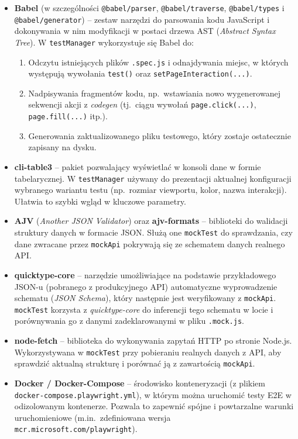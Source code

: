 \documentclass[12pt]{report}
\begin{document}
\begin{itemize}
    \item \textbf{Babel} (w szczególności \verb|@babel/parser|, \verb|@babel/traverse|, \verb|@babel/types| i \verb|@babel/generator|) -- zestaw narzędzi do parsowania kodu JavaScript i dokonywania w nim modyfikacji w postaci drzewa AST (\emph{Abstract Syntax Tree}). W \texttt{testManager} wykorzystuje się Babel do:
    \begin{enumerate}
        \item Odczytu istniejących plików \texttt{.spec.js} i odnajdywania miejsc, w których występują wywołania \texttt{test()} oraz \texttt{setPageInteraction(...)}.
        \item Nadpisywania fragmentów kodu, np.~wstawiania nowo wygenerowanej sekwencji akcji z \emph{codegen} (tj.~ciągu wywołań \verb|page.click(...)|, \verb|page.fill(...)| itp.).
        \item Generowania zaktualizowanego pliku testowego, który zostaje ostatecznie zapisany na dysku.
    \end{enumerate}

    \item \textbf{cli-table3} -- pakiet pozwalający wyświetlać w konsoli dane w formie tabelarycznej. W \texttt{testManager} używany do prezentacji aktualnej konfiguracji wybranego wariantu testu (np.~rozmiar viewportu, kolor, nazwa interakcji). Ułatwia to szybki wgląd w kluczowe parametry.

    \item \textbf{AJV} (\emph{Another JSON Validator}) oraz \textbf{ajv-formats} -- biblioteki do walidacji struktury danych w formacie JSON. Służą one \texttt{mockTest} do sprawdzania, czy dane zwracane przez \texttt{mockApi} pokrywają się ze schematem danych realnego API.

    \item \textbf{quicktype-core} -- narzędzie umożliwiające na podstawie przykładowego JSON-u (pobranego z produkcyjnego API) automatyczne wyprowadzenie schematu (\emph{JSON Schema}), który następnie jest weryfikowany z \texttt{mockApi}. \texttt{mockTest} korzysta z \emph{quicktype-core} do inferencji tego schematu w locie i porównywania go z danymi zadeklarowanymi w pliku \texttt{.mock.js}.

    \item \textbf{node-fetch} -- biblioteka do wykonywania zapytań HTTP po stronie Node.js. Wykorzystywana w \texttt{mockTest} przy pobieraniu realnych danych z API, aby sprawdzić aktualną strukturę i porównać ją z zawartością \texttt{mockApi}.

    \item \textbf{Docker / Docker-Compose} -- środowisko konteneryzacji (z plikiem \texttt{docker-compose.playwright.yml}), w którym można uruchomić testy E2E w odizolowanym kontenerze. Pozwala to zapewnić spójne i powtarzalne warunki uruchomieniowe (m.in.~zdefiniowana wersja \verb|mcr.microsoft.com/playwright|). 

\end{itemize}
\end{document}
